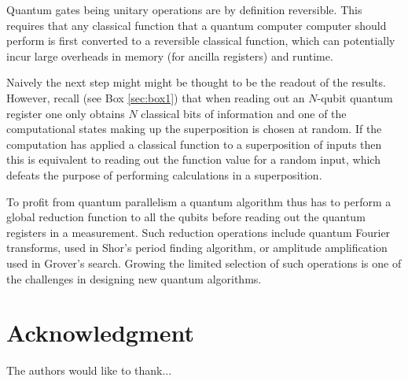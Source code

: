\documentclass[journal]{IEEEtran}
\begin{document}
Quantum gates being unitary operations are by definition reversible. This requires that any classical function that a quantum computer computer should perform is first converted to a reversible classical function, which can potentially incur large overheads in memory (for ancilla registers) and runtime.

Naively the next step might might be thought to be the readout of the results. However, recall (see Box \ref{sec:box1}) that when reading out an $N$-qubit quantum register one only obtains $N$ classical bits of information and one of the computational states making up the superposition is chosen at random. If the computation has applied a classical function to a superposition of inputs then this is  equivalent to reading out the function value for a random input, which defeats the purpose of performing calculations in a superposition. 

To profit from quantum parallelism a quantum algorithm thus has to perform a global reduction function to all the qubits before reading out the quantum registers in a measurement. Such reduction operations include quantum Fourier transforms, used in Shor's period finding algorithm, or amplitude amplification used in Grover's search. Growing the limited selection of such operations is one of the challenges in designing new quantum algorithms.







\section*{Acknowledgment}


The authors would like to thank...


\ifCLASSOPTIONcaptionsoff
  \newpage
\fi




\end{document}
